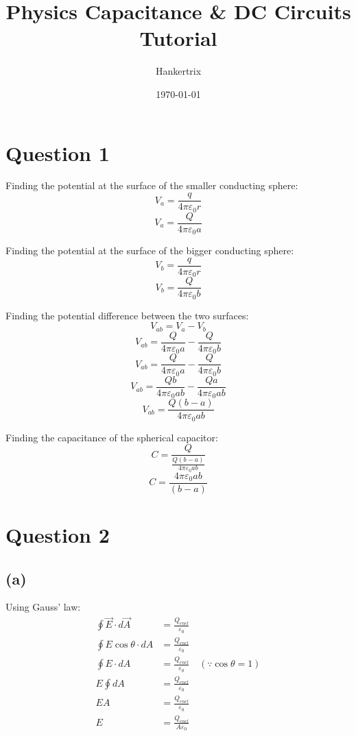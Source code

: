 \documentclass[11pt]{article}
\author{Hankertrix}
\date{\today}
\title{Physics Capacitance \& DC Circuits Tutorial}
\begin{document}
\maketitle
\setcounter{tocdepth}{2}
\tableofcontents

\newpage

\section{Question 1}
\label{sec:org6ed617b}
Finding the potential at the surface of the smaller conducting sphere:
\[V_a = \frac{q}{4 \pi \varepsilon_0 r}\]
\[V_a = \frac{Q}{4 \pi \varepsilon_0 a}\]

Finding the potential at the surface of the bigger conducting sphere:
\[V_b = \frac{q}{4 \pi \varepsilon_0 r}\]
\[V_b = \frac{Q}{4 \pi \varepsilon_0 b}\]

Finding the potential difference between the two surfaces:
\[V_{ab} = V_a - V_b\]
\[V_{ab} = \frac{Q}{4 \pi \varepsilon_0 a} - \frac{Q}{4 \pi \varepsilon_0 b}\]
\[V_{ab} = \frac{Q}{4 \pi \varepsilon_0 a} - \frac{Q}{4 \pi \varepsilon_0 b}\]
\[V_{ab} = \frac{Qb}{4 \pi \varepsilon_0 ab} - \frac{Qa}{4 \pi \varepsilon_0 ab}\]
\[V_{ab} = \frac{Q(b - a)}{4 \pi \varepsilon_0 ab}\]

Finding the capacitance of the spherical capacitor:
\[C = \frac{Q}{\frac{Q(b - a)}{4 \pi \varepsilon_0 ab}}\]
\[C = \frac{4 \pi \varepsilon_0 ab}{(b - a)}\]


\section{Question 2}
\label{sec:org96d5baf}

\subsection{(a)}
\label{sec:org14d081f}
Using Gauss' law:
\begin{align*}
\oint \vec{E} \cdot d \vec{A} &= \frac{Q_{encl}}{\varepsilon_0} \\
\oint E \cos \theta \cdot dA &= \frac {Q_{encl}}{\varepsilon_0} \\
\oint E \cdot dA &= \frac {Q_{encl}}{\varepsilon_0} \quad (\because \cos \theta = 1) \\
E \oint dA &= \frac {Q_{encl}}{\varepsilon_0} \\
E A &= \frac {Q_{encl}}{\varepsilon_0} \\
E &= \frac {Q_{encl}}{A \varepsilon_0} \\
\end{align*}
\end{document}
